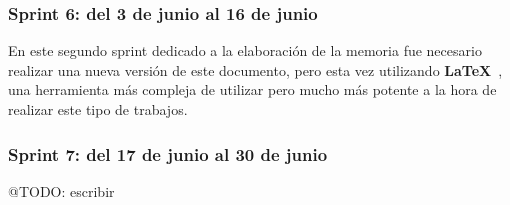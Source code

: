 \subsubsection{Sprint 6: del 3 de junio al 16 de junio}

En este segundo sprint dedicado a la elaboración de la memoria fue necesario realizar una nueva versión de este
documento, pero esta vez utilizando \textbf{LaTeX}~\cite{https://www.latex-project.org/}, una herramienta más compleja
de utilizar pero mucho más potente a la hora de realizar este tipo de trabajos.

\subsubsection{Sprint 7: del 17 de junio al 30 de junio}

\colorbox{color_highlight}{@TODO: escribir}